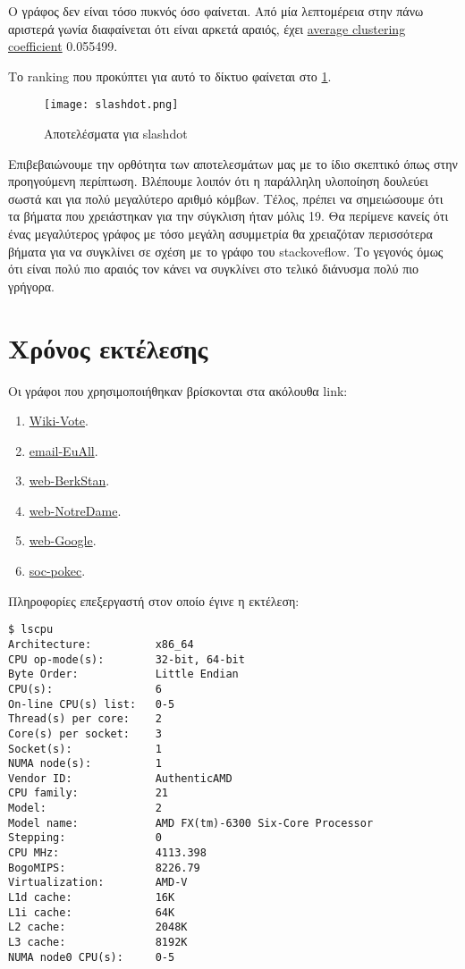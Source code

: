 Ο γράφος δεν είναι τόσο πυκνός όσο φαίνεται.
Από μία λεπτομέρεια στην πάνω αριστερά γωνία διαφαίνεται ότι είναι αρκετά αραιός,
έχει
\href{https://en.wikipedia.org/wiki/Clustering_coefficient#Global_clustering_coefficient}{average clustering coefficient} 0.055499.

Το ranking που προκύπτει για αυτό το δίκτυο φαίνεται στο
\hyperref[fig:slackres]{\figurename{} \ref{fig:slackres}}.
\begin{figure}[h!t]
	\centering
	\texttt{[image: slashdot.png]}
	\caption{Αποτελέσματα για slashdot}
	\label{fig:slackres}
\end{figure}
Επιβεβαιώνουμε την ορθότητα των αποτελεσμάτων μας με το ίδιο σκεπτικό όπως στην προηγούμενη περίπτωση.
Βλέπουμε λοιπόν ότι η παράλληλη υλοποίηση δουλεύει σωστά και για πολύ μεγαλύτερο αριθμό κόμβων.
Τέλος, πρέπει να σημειώσουμε ότι τα βήματα που χρειάστηκαν για την σύγκλιση ήταν μόλις 19.
Θα περίμενε κανείς ότι ένας μεγαλύτερος γράφος με τόσο μεγάλη ασυμμετρία θα χρειαζόταν περισσότερα βήματα για να συγκλίνει σε σχέση με το γράφο του stackoveflow.
Το γεγονός όμως ότι είναι πολύ πιο αραιός τον κάνει να συγκλίνει στο τελικό διάνυσμα πολύ πιο γρήγορα.
\clearpage
\section{Χρόνος εκτέλεσης}
Οι γράφοι που χρησιμοποιήθηκαν βρίσκονται στα ακόλουθα link:
\begin{enumerate} 
	\item \href{https://snap.stanford.edu/data/wiki-Vote.html}{Wiki-Vote}.
	\item \href{https://snap.stanford.edu/data/email-EuAll.html}{email-EuAll}.
	\item \href{https://snap.stanford.edu/data/web-BerkStan.html}{web-BerkStan}.
	\item \href{https://snap.stanford.edu/data/web-NotreDame.html}{web-NotreDame}.
	\item \href{https://snap.stanford.edu/data/web-Google.html}{web-Google}.
	\item \href{https://snap.stanford.edu/data/soc-pokec.html}{soc-pokec}.
\end{enumerate}

Πληροφορίες επεξεργαστή στον οποίο έγινε η εκτέλεση:
\begin{lstlisting}[style=Bash]
$ lscpu
Architecture:          x86_64
CPU op-mode(s):        32-bit, 64-bit
Byte Order:            Little Endian
CPU(s):                6
On-line CPU(s) list:   0-5
Thread(s) per core:    2
Core(s) per socket:    3
Socket(s):             1
NUMA node(s):          1
Vendor ID:             AuthenticAMD
CPU family:            21
Model:                 2
Model name:            AMD FX(tm)-6300 Six-Core Processor
Stepping:              0
CPU MHz:               4113.398
BogoMIPS:              8226.79
Virtualization:        AMD-V
L1d cache:             16K
L1i cache:             64K
L2 cache:              2048K
L3 cache:              8192K
NUMA node0 CPU(s):     0-5
\end{lstlisting}

